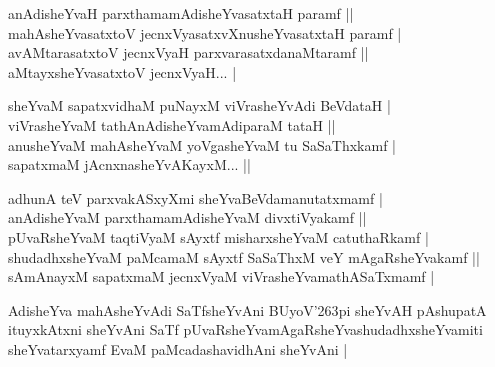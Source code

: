 \begin{entry}
\begin{shl}
anAdisheYvaH parxthamamAdisheYvasatxtaH paramf ||\\[2pt]
mahAsheYvasatxtoV jecnxVyasatxvXnusheYvasatxtaH paramf |\\[2pt]
avAMtarasatxtoV jecnxVyaH parxvarasatxdanaMtaramf ||\\[2pt]
aMtayxsheYvasatxtoV jecnxVyaH... |\\[-1pt]
\end{shl}
\medskip
{}
\medskip
{}
\medskip
\begin{shl}
sheYvaM sapatxvidhaM puNayxM viVrasheYvAdi BeVdataH |\\[2pt]
viVrasheYvaM tathAnAdisheYvamAdiparaM tataH ||\\[2pt]
anusheYvaM mahAsheYvaM yoVgasheYvaM tu SaSaThxkamf |\\[2pt]
sapatxmaM jAcnxnasheYvAKayxM... ||\\[-1pt]
\end{shl}
\medskip
{}
\medskip
{}
\medskip
\begin{shl}
adhunA teV parxvakASxyXmi sheYvaBeVdamanutatxmamf |\\[2pt]
anAdisheYvaM parxthamamAdisheYvaM divxtiVyakamf ||\\[2pt]
pUvaRsheYvaM taqtiVyaM sAyxtf misharxsheYvaM catuthaRkamf |\\[2pt]
shudadhxsheYvaM paMcamaM sAyxtf SaSaThxM veY mAgaRsheYvakamf ||\\[2pt]
sAmAnayxM sapatxmaM jecnxVyaM viVrasheYvamathASaTxmamf |\\[-1pt]
\end{shl}
\medskip
{}
\medskip
{}
\medskip
\begin{shl}
AdisheYva mahAsheYvAdi SaTfsheYvAni BUyoV{\char'263}pi sheYvAH pAshupatA ituyxkAtxni sheYvAni SaTf pUvaRsheYvamAgaRsheYvashudadhxsheYvamiti sheYvatarxyamf EvaM paMcadashavidhAni sheYvAni |
\end{shl}
\medskip
{}

\end{entry}
